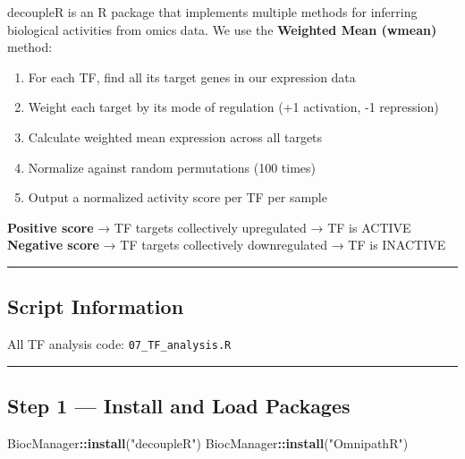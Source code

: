 \documentclass[
]{article}
\newenvironment{Shaded}{\begin{snugshade}}{\end{snugshade}}
\newcommand{\FunctionTok}[1]{\textcolor[rgb]{0.13,0.29,0.53}{\textbf{#1}}}
\newcommand{\NormalTok}[1]{#1}
\newcommand{\SpecialCharTok}[1]{\textcolor[rgb]{0.81,0.36,0.00}{\textbf{#1}}}
\newcommand{\StringTok}[1]{\textcolor[rgb]{0.31,0.60,0.02}{#1}}
\providecommand{\tightlist}{%
  \setlength{\itemsep}{0pt}\setlength{\parskip}{0pt}}
\begin{document}
decoupleR is an R package that implements multiple methods for inferring
biological activities from omics data. We use the \textbf{Weighted Mean
(wmean)} method:

\begin{enumerate}
\def\labelenumi{\arabic{enumi}.}
\tightlist
\item
  For each TF, find all its target genes in our expression data
\item
  Weight each target by its mode of regulation (+1 activation, -1
  repression)
\item
  Calculate weighted mean expression across all targets
\item
  Normalize against random permutations (100 times)
\item
  Output a normalized activity score per TF per sample
\end{enumerate}

\textbf{Positive score} → TF targets collectively upregulated → TF is
ACTIVE \textbf{Negative score} → TF targets collectively downregulated →
TF is INACTIVE

\begin{center}\rule{0.5\linewidth}{0.5pt}\end{center}

\subsection{Script Information}\label{script-information-2}

All TF analysis code: \texttt{07\_TF\_analysis.R}

\begin{center}\rule{0.5\linewidth}{0.5pt}\end{center}

\subsection{Step 1 --- Install and Load
Packages}\label{step-1-install-and-load-packages-1}

\begin{Shaded}
\begin{Highlighting}[]
\NormalTok{BiocManager}\SpecialCharTok{::}\FunctionTok{install}\NormalTok{(}\StringTok{"decoupleR"}\NormalTok{)}
\NormalTok{BiocManager}\SpecialCharTok{::}\FunctionTok{install}\NormalTok{(}\StringTok{"OmnipathR"}\NormalTok{)}
\end{Highlighting}
\end{Shaded}
\end{document}
